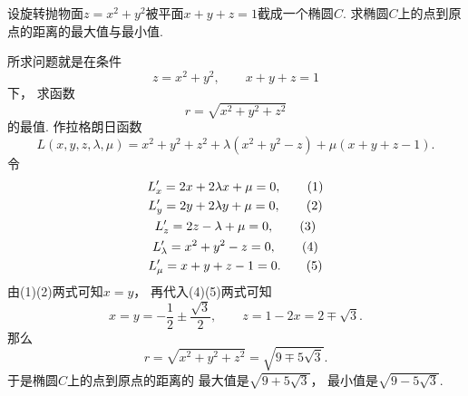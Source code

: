 \begin{example}
设旋转抛物面\(z = x^2 + y^2\)被平面\(x + y + z = 1\)截成一个椭圆\(C\).
求椭圆\(C\)上的点到原点的距离的最大值与最小值.
\begin{solution}
所求问题就是在条件\begin{equation*}
	z = x^2 + y^2,
	\qquad
	x + y + z = 1
\end{equation*}下，
求函数\begin{equation*}
	r = \sqrt{x^2+y^2+z^2}
\end{equation*}的最值.
作拉格朗日函数\begin{equation*}
	L(x,y,z,\lambda,\mu)
	= x^2+y^2+z^2 + \lambda(x^2+y^2-z) + \mu(x+y+z-1).
\end{equation*}
令\begin{gather*}
	L'_x = 2x + 2\lambda x + \mu = 0, \tag1 \\
	L'_y = 2y + 2\lambda y + \mu = 0, \tag2 \\
	L'_z = 2z - \lambda + \mu = 0, \tag3 \\
	L'_\lambda = x^2+y^2-z = 0, \tag4 \\
	L'_\mu = x+y+z-1 = 0. \tag5
\end{gather*}
由(1)(2)两式可知\(x = y\)，
再代入(4)(5)两式可知\begin{equation*}
	x = y = -\frac12 \pm \frac{\sqrt3}2,
	\qquad
	z = 1-2x = 2 \mp \sqrt3.
\end{equation*}
那么\begin{equation*}
	r = \sqrt{x^2+y^2+z^2}
	= \sqrt{9 \mp 5\sqrt3}.
\end{equation*}
于是椭圆\(C\)上的点到原点的距离的
最大值是\(\sqrt{9+5\sqrt3}\)，
最小值是\(\sqrt{9-5\sqrt3}\).
\end{solution}
\end{example}

